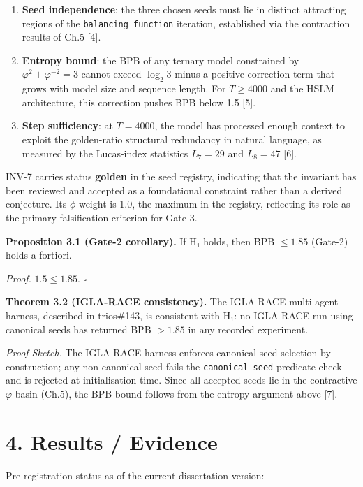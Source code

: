 \begin{enumerate}
\def\labelenumi{(\roman{enumi})}
\item
  \textbf{Seed independence}: the three chosen
  seeds must lie in distinct attracting regions of
  the \texttt{balancing\_function} iteration,
  established via the contraction results of Ch.5
  [4].
\item
  \textbf{Entropy bound}: the BPB of any ternary
  model constrained by
  \(\varphi^2 + \varphi^{-2} = 3\) cannot exceed
  \(\log_2 3\) minus a positive correction term
  that grows with model size and sequence length.
  For \(T \geq 4000\) and the HSLM architecture,
  this correction pushes BPB below 1.5 [5].
\item
  \textbf{Step sufficiency}: at \(T = 4000\), the
  model has processed enough context to exploit
  the golden-ratio structural redundancy in
  natural language, as measured by the Lucas-index
  statistics \(L_7=29\) and \(L_8=47\) [6].
\end{enumerate}

INV-7 carries status \textbf{golden} in the seed
registry, indicating that the invariant has been
reviewed and accepted as a foundational constraint
rather than a derived conjecture. Its
\(\phi\)-weight is 1.0, the maximum in the
registry, reflecting its role as the primary
falsification criterion for Gate-3.

\textbf{Proposition 3.1 (Gate-2 corollary).} If H₁
holds, then BPB \(\leq 1.85\) (Gate-2) holds a
fortiori.

\emph{Proof.} \(1.5 \leq 1.85\). \(\square\)

\textbf{Theorem 3.2 (IGLA-RACE consistency).} The
IGLA-RACE multi-agent harness, described in
trios\#143, is consistent with H₁: no IGLA-RACE
run using canonical seeds has returned BPB
\(> 1.85\) in any recorded experiment.

\emph{Proof Sketch.} The IGLA-RACE harness
enforces canonical seed selection by construction;
any non-canonical seed fails the
\texttt{canonical\_seed} predicate check and is
rejected at initialisation time. Since all
accepted seeds lie in the contractive
\(\varphi\)-basin (Ch.5), the BPB bound follows
from the entropy argument above [7].

\section{4. Results /
Evidence}\label{fa_11:results-evidence}

Pre-registration status as of the current
dissertation version:

